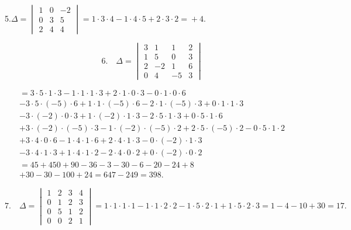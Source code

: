 \documentclass[11pt]{article}
\providecommand{\weberpage}[1]{}
\let\Delta\varDelta
\begin{document}
5.\quad $\Delta = \begin{vmatrix} 1 & 0 & -2 \\ 0 & 3 & 5 \\ 2 & 4 & 4 \end{vmatrix} = 1\cdot 3\cdot 4 - 1\cdot 4\cdot 5 + 2\cdot 3\cdot 2 = {}+4.$

\[
6.\quad \Delta = \begin{vmatrix} 3 & 1 & 1 & 2 \\ 1 & 5 & 0 & 3 \\ 2 & -2 & 1 & 6 \\ 0 & 4 & -5 & 3 \end{vmatrix}
\]


\weberpage{21}
\[
\begin{array}{l}
= 3\cdot 5\cdot 1\cdot 3 - 1\cdot 1\cdot 1\cdot 3 + 2\cdot 1\cdot 0\cdot 3 - 0\cdot 1\cdot 0\cdot 6\\
- 3\cdot 5\cdot(-5)\cdot 6 + 1\cdot 1\cdot(-5)\cdot 6 - 2\cdot 1\cdot(-5)\cdot 3 + 0\cdot 1\cdot 1\cdot 3\\
- 3\cdot(-2)\cdot 0\cdot 3 + 1\cdot(-2)\cdot 1\cdot 3 - 2\cdot 5\cdot 1\cdot 3 + 0\cdot 5\cdot 1\cdot 6\\
+ 3\cdot(-2)\cdot(-5)\cdot 3 - 1\cdot(-2)\cdot(-5)\cdot 2 + 2\cdot 5\cdot(-5)\cdot 2 - 0\cdot 5\cdot 1\cdot 2\\
+ 3\cdot 4\cdot 0\cdot 6 - 1\cdot 4\cdot 1\cdot 6 + 2\cdot 4\cdot 1\cdot 3 - 0\cdot(-2)\cdot 1\cdot 3\\
- 3\cdot 4\cdot 1\cdot 3 + 1\cdot 4\cdot 1\cdot 2 - 2\cdot 4\cdot 0\cdot 2 + 0\cdot(-2)\cdot 0\cdot 2\\
= 45 + 450 + 90 - 36 - 3 - 30 - 6 - 20 - 24 + 8\\
+ 30 - 30 - 100 + 24 = 647 - 249 = 398.
\end{array}
\]

\[
7.\quad \Delta = \begin{vmatrix} 1 & 2 & 3 & 4\\ 0 & 1 & 2 & 3\\ 0 & 5 & 1 & 2\\ 0 & 0 & 2 & 1 \end{vmatrix} = 1\cdot 1\cdot 1\cdot 1 - 1\cdot 1\cdot 2\cdot 2 - 1\cdot 5\cdot 2\cdot 1 + 1\cdot 5\cdot 2\cdot 3 = 1 - 4 - 10 + 30 = 17.
\]
\end{document}
